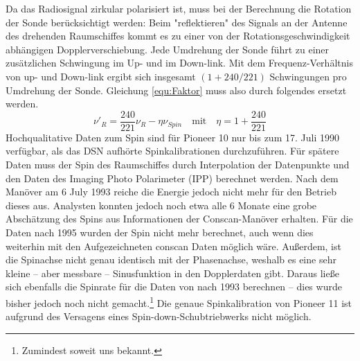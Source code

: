 Da das Radiosignal zirkular polarisiert ist, muss bei der Berechnung die Rotation der Sonde berücksichtigt werden: Beim "reflektieren" des Signals an der Antenne des drehenden Raumschiffes kommt es zu einer von der Rotationsgeschwindigkeit abhängigen Dopplerverschiebung. Jede Umdrehung der Sonde führt zu einer zusätzlichen Schwingung im Up- und im Down-link. Mit dem Frequenz-Verhältnis von up- und Down-link ergibt sich insgesamt $(1+240/221)$ Schwingungen pro Umdrehung der Sonde.\cite{Anderson2002} %
Gleichung \ref{equ:Faktor} muss also durch folgendes ersetzt werden.
\begin{equation}
\nu'_R = \frac{240}{221}\nu_R - \eta\nu_{Spin} \quad \mathrm{mit}  \quad \eta = 1+ \frac{240}{221}
\end{equation}
Hochqualitative Daten zum Spin sind für Pioneer 10 nur bis zum 17. Juli 1990 verfügbar, als das DSN aufhörte Spinkalibrationen durchzuführen. Für spätere Daten muss der Spin des Raumschiffes durch Interpolation der Datenpunkte und den Daten des Imaging Photo Polarimeter (IPP) berechnet werden. Nach dem Manöver am 6 July 1993 reiche die Energie jedoch nicht mehr für den Betrieb dieses aus. Analysten konnten jedoch noch etwa alle 6 Monate eine grobe Abschätzung des Spins aus Informationen der Conscan-Manöver erhalten. %
Für die Daten nach 1995 wurden der Spin nicht mehr berechnet, auch wenn dies weiterhin mit den Aufgezeichneten conscan Daten möglich wäre. Außerdem, ist die Spinachse nicht genau identisch mit der Phasenachse, weshalb es eine sehr kleine – aber messbare – Sinusfunktion in den Dopplerdaten gibt. Daraus ließe sich ebenfalls die Spinrate für die Daten von nach 1993 berechnen – dies wurde bisher jedoch noch nicht gemacht.\footnote{Zumindest soweit uns bekannt.}
Die genaue Spinkalibration von Pioneer 11 ist aufgrund des Versagens eines Spin-down-Schubtriebwerks nicht möglich.\cite{Anderson2002}

